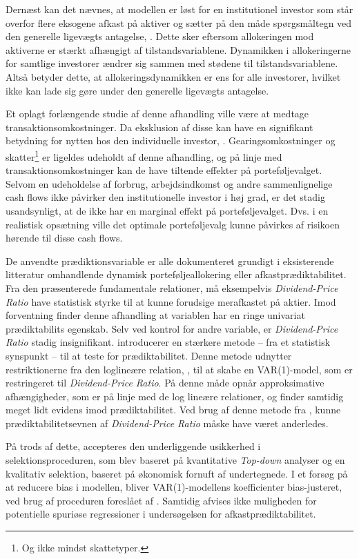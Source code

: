 \documentclass[
  a4paper,
  oneside]{memoir}
\begin{document}
Dernæst kan det nævnes, at modellen er løst for en institutionel investor som står overfor flere eksogene afkast på aktiver og sætter på den måde spørgsmåltegn ved den generelle ligevægts antagelse, \citep{CampVic2001}. Dette sker eftersom allokeringen mod aktiverne er stærkt afhængigt af tilstandsvariablene. Dynamikken i allokeringerne for samtlige investorer ændrer sig sammen med stødene til tilstandsvariablene. Altså betyder dette, at allokeringsdynamikken er ens for alle investorer, hvilket ikke kan lade sig gøre under den generelle ligevægts antagelse.

Et oplagt forlængende studie af denne afhandling ville være at medtage transaktionsomkostninger. Da eksklusion af disse kan have en signifikant betydning for nytten hos den individuelle investor, \citep{BalLyn1999}. Gearingsomkostninger og skatter\footnote{Og ikke mindst skattetyper.} er ligeldes udeholdt af denne afhandling, og på linje med transaktionsomkostninger kan de have tiltende effekter på porteføljevalget. Selvom en udeholdelse af forbrug, arbejdsindkomst og andre sammenlignelige cash flows ikke påvirker den institutionelle investor i høj grad, er det stadig usandsynligt, at de ikke har en marginal effekt på porteføljevalget. Dvs. i en realistisk opsætning ville det optimale porteføljevalg kunne påvirkes af risikoen hørende til disse cash flows.

De anvendte prædiktionsvariable er alle dokumenteret grundigt i eksisterende litteratur omhandlende dynamisk porteføljeallokering eller afkastprædiktabilitet. Fra den præsenterede fundamentale relationer, må eksempelvis \emph{Dividend-Price Ratio} have statistisk styrke til at kunne forudsige merafkastet på aktier. Imod forventning finder denne afhandling at variablen har en ringe univariat prædiktabilits egenskab. Selv ved kontrol for andre variable, er \emph{Dividend-Price Ratio} stadig insignifikant. \citep{Cochrane2008} introducerer en stærkere metode -- fra et statistisk synspunkt -- til at teste for prædiktabilitet. Denne metode udnytter restriktionerne fra den loglineære relation, \citep{Campbell1988}, til at skabe en VAR(1)-model, som er restringeret til \emph{Dividend-Price Ratio}. På denne måde opnår \citep{Cochrane2008} approksimative afhængigheder, som er på linje med de log lineære relationer, og finder samtidig meget lidt evidens imod prædiktabilitet. Ved brug af denne metode fra \citep{Cochrane2008}, kunne prædiktabilitetsevnen af \emph{Dividend-Price Ratio} måske have været anderledes.

På trods af dette, accepteres den underliggende usikkerhed i selektionsproceduren, som blev baseret på kvantitative \emph{Top-down} analyser og en kvalitativ selektion, baseret på økonomisk fornuft af undertegnede. I et forsøg på at reducere bias i modellen, bliver VAR(1)-modellens koefficienter bias-justeret, ved brug af proceduren foreslået af \citep{Pope1990}. Samtidig afvises ikke muligheden for potentielle spuriøse regressioner i undersøgelsen for afkastprædiktabilitet.
\end{document}
